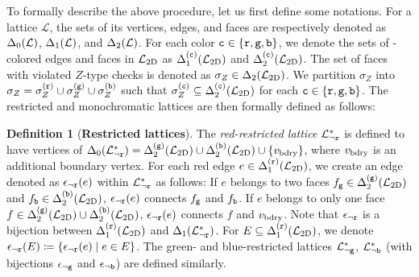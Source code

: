\documentclass[a4paper,twocolumn,11pt,accepted=2025-01-21]{quantumarticle}
\theoremstyle{definition}
\theoremstyle{definition}
\newtheorem{definition}{Definition}
\theoremstyle{definition}
\begin{document}
To formally describe the above procedure, let us first define some notations.
For a lattice $\mathcal{L}$, the sets of its vertices, edges, and faces are respectively denoted as $\latelm{\mathcal{L}}{0}$, $\latelm{\mathcal{L}}{1}$, and $\latelm{\mathcal{L}}{2}$.
For each color $\cbs \in \qty{\rbs, \gbs, \bbs}$, we denote the sets of \cbs-colored edges and faces in $\LatticeTwoD$ as $\latelmcolor{\LatticeTwoD}{1}{\cbs}$ and $\latelmcolor{\LatticeTwoD}{2}{\cbs}$.
The set of faces with violated $Z$-type checks is denoted as $\sigma_Z \in \latelm{\LatticeTwoD}{2}$.
We partition $\sigma_Z$ into $\sigma_Z = \sigma_Z^{(\rbs)} \cup \sigma_Z^{(\gbs)} \cup \sigma_Z^{(\bbs)}$ such that $\sigma_Z^{(\cbs)} \subseteq \latelmcolor{\LatticeTwoD}{2}{\cbs}$ for each $\cbs \in \qty{\rbs, \gbs, \bbs}$.
The restricted and monochromatic lattices are then formally defined as follows:
\begin{definition}[\textbf{Restricted lattices}]
    The \emph{red-restricted lattice} $\LatticeRest{\rbs}$ is defined to have vertices of $\latelm{\LatticeRest{\rbs}}{0} = \latelmcolor{\LatticeTwoD}{2}{\gbs} \cup \latelmcolor{\LatticeTwoD}{2}{\bbs} \cup \qty{v_\mr{bdry}}$, where $v_\mr{bdry}$ is an additional boundary vertex. 
    For each red edge $e \in \latelmcolor{\LatticeTwoD}{1}{\rbs}$, we create an edge denoted as $\EdgeCorrRest{\rbs}(e)$ within $\LatticeRest{\rbs}$ as follows:
    If $e$ belongs to two faces $f_\gbs \in \latelmcolor{\LatticeTwoD}{2}{\gbs}$ and $f_\bbs \in \latelmcolor{\LatticeTwoD}{2}{\bbs}$, $\EdgeCorrRest{\rbs}(e)$ connects $f_\gbs$ and $f_\bbs$.
    If $e$ belongs to only one face $f \in \latelmcolor{\LatticeTwoD}{2}{\gbs} \cup \latelmcolor{\LatticeTwoD}{2}{\bbs}$, $\EdgeCorrRest{\rbs}(e)$ connects $f$ and $v_\mr{bdry}$.
    Note that $\EdgeCorrRest{\rbs}$ is a bijection between $\latelmcolor{\LatticeTwoD}{1}{\rbs}$ and $\latelm{\LatticeRest{\rbs}}{1}$.
    For $E \subseteq \latelmcolor{\LatticeTwoD}{1}{\rbs}$, we denote $\EdgeCorrRest{\rbs}(E) \coloneqq \qty{ \EdgeCorrRest{\rbs}(e) \mid e \in E}$.
    The green- and blue-restricted lattices $\LatticeRest{\gbs}$, $\LatticeRest{\bbs}$ (with bijections $\EdgeCorrRest{\gbs}$ and $\EdgeCorrRest{\bbs}$) are defined similarly.
    \label{def:restricted_lattices}
\end{definition}
\end{document}
